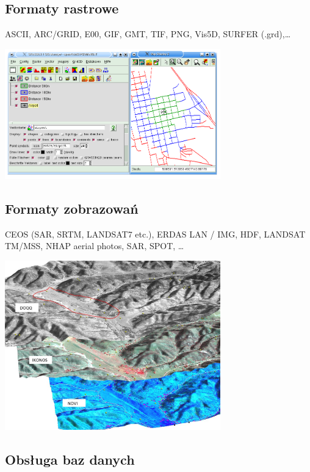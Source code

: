 \documentclass[notumble,a4paper,10pt,nofoldmark]{leaflet}
\newenvironment{myfig}[1][0pt plus 1.5ex minus .5ex]{\par\vspace*{#1}\begin{minipage}{\textwidth}\centering}{\end{minipage}}
\begin{document}
\subsection{Formaty rastrowe}
ASCII, ARC/GRID, E00, GIF, GMT, TIF, PNG, Vis5D, SURFER (.grd),\dots
\begin{myfig}
\includegraphics[width=0.7\textwidth]{pix/isodist}
\end{myfig}

\subsection{Formaty zobrazowań}

CEOS (SAR, SRTM, LANDSAT7 etc.), ERDAS LAN / IMG, HDF, LANDSAT TM/MSS, NHAP aerial photos, SAR, SPOT, \dots
\begin{myfig}[1.5ex]
\includegraphics[width=0.7\textwidth]{pix/ndvi}
\end{myfig}

\subsection{Obsługa baz danych}
\end{document}
